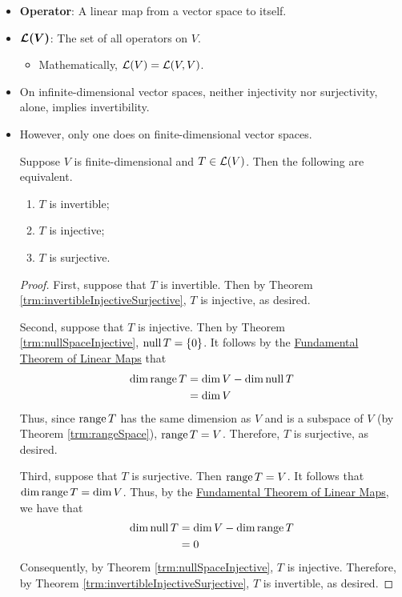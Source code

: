 \documentclass[../main.tex]{subfiles}
\begin{document}
\begin{itemize}
    \item \textbf{Operator}: A linear map from a vector space to itself.
    \item $\bm{\mathcal{L}(V)}$: The set of all operators on $V$.
    \begin{itemize}
        \item Mathematically, $\mathcal{L}(V)=\mathcal{L}(V,V)$.
    \end{itemize}
    \item On infinite-dimensional vector spaces, neither injectivity nor surjectivity, alone, implies invertibility.
    \item However, only one does on finite-dimensional vector spaces.
    \begin{theorem}\label{trm:invertInjSurjFiniteEquivalence}
        Suppose $V$ is finite-dimensional and $T\in\mathcal{L}(V)$. Then the following are equivalent.
        \begin{enumerate}[label={\textup{(}\alph*\textup{)}}]
            \item $T$ is invertible;
            \item $T$ is injective;
            \item $T$ is surjective.
        \end{enumerate}
        \begin{proof}
            First, suppose that $T$ is invertible. Then by Theorem \ref{trm:invertibleInjectiveSurjective}, $T$ is injective, as desired.\par
            Second, suppose that $T$ is injective. Then by Theorem \ref{trm:nullSpaceInjective}, $\operatorname{null} T=\{0\}$. It follows by the \hyperref[trm:fundamentalTheoremLinearMaps]{Fundamental Theorem of Linear Maps} that
            \begin{align*}
                \dim\operatorname{range} T &= \dim V-\dim\operatorname{null} T\\
                &= \dim V
            \end{align*}
            Thus, since $\operatorname{range} T$ has the same dimension as $V$ and is a subspace of $V$ (by Theorem \ref{trm:rangeSpace}), $\operatorname{range} T=V$. Therefore, $T$ is surjective, as desired.\par
            Third, suppose that $T$ is surjective. Then $\operatorname{range} T=V$. It follows that $\dim\operatorname{range} T=\dim V$. Thus, by the \hyperref[trm:fundamentalTheoremLinearMaps]{Fundamental Theorem of Linear Maps}, we have that
            \begin{align*}
                \dim\operatorname{null} T &= \dim V-\dim\operatorname{range} T\\
                &= 0
            \end{align*}
            Consequently, by Theorem \ref{trm:nullSpaceInjective}, $T$ is injective. Therefore, by Theorem \ref{trm:invertibleInjectiveSurjective}, $T$ is invertible, as desired.
        \end{proof}
    \end{theorem}
\end{itemize}
\end{document}

